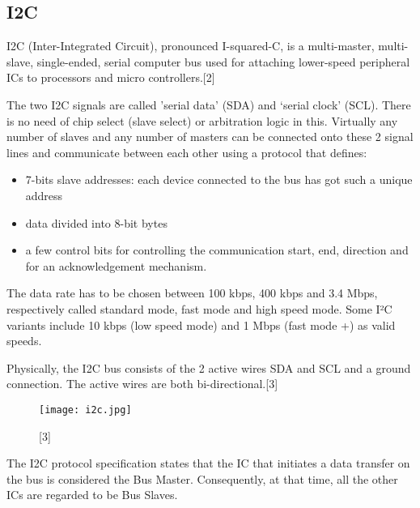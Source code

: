\documentclass[11pt,a4paper]{article}
\begin{document}
	\subsection{I2C}
	I2C (Inter-Integrated Circuit), pronounced I-squared-C, is a multi-master, multi-slave, single-ended, serial computer bus used for attaching lower-speed peripheral ICs to processors and micro controllers.[2]
	
	The two I2C signals are called 'serial data’ (SDA) and ‘serial clock’ (SCL). There is no need of chip select (slave select) or arbitration logic in this. Virtually any number of slaves and any number of masters can be connected onto these 2 signal lines and communicate between each other using a protocol that defines:
	\begin{itemize}
			\item 7-bits slave addresses: each device connected to the bus has got such a unique address
			\item data divided into 8-bit bytes
			\item a few control bits for controlling the communication start, end, direction and for an acknowledgement mechanism.
	\end{itemize}

	The data rate has to be chosen between 100 kbps, 400 kbps and 3.4 Mbps, respectively called standard mode, fast mode and high speed mode. Some I²C variants include 10 kbps (low speed mode) and 1 Mbps (fast mode +) as valid speeds.
	
	Physically, the I2C bus consists of the 2 active wires SDA and SCL and a ground connection. The active wires are both bi-directional.[3] 
	\begin{figure}[h!]
		\texttt{[image: i2c.jpg]}
		\centering
		\caption{[3]}
	\end{figure} 
	
	\newpage
	The I2C protocol specification states that the IC that initiates a data transfer on the bus is considered the Bus Master. Consequently, at that time, all the other ICs are regarded to be Bus Slaves. 
	
\end{document}
